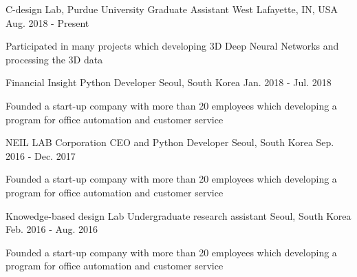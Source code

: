


\begin{cventries}


\cventry
{C-design Lab, Purdue University} %
{Graduate Assistant} %
{West Lafayette, IN, USA} %
{Aug. 2018 - Present} %
{ %
\begin{cvitems}
\item {Participated in many projects which developing 3D Deep Neural Networks and processing the 3D data}
\end{cvitems}
}

\cventry
{Financial Insight} %
{Python Developer} %
{Seoul, South Korea} %
{Jan. 2018 - Jul. 2018} %
{ %
\begin{cvitems}
\item {Founded a start-up company with more than 20 employees which developing a program for office automation and customer service}
\end{cvitems}
}

\cventry
{NEIL LAB Corporation} %
{CEO and Python Developer} %
{Seoul, South Korea} %
{Sep. 2016 - Dec. 2017} %
{ %
\begin{cvitems}
\item {Founded a start-up company with more than 20 employees which developing a program for office automation and customer service}
\end{cvitems}
}

\cventry
{Knowedge-based design Lab} %
{Undergraduate research assistant} %
{Seoul, South Korea} %
{Feb. 2016 - Aug. 2016} %
{ %
\begin{cvitems}
\item {Founded a start-up company with more than 20 employees which developing a program for office automation and customer service}
\end{cvitems}
}


\end{cventries}
